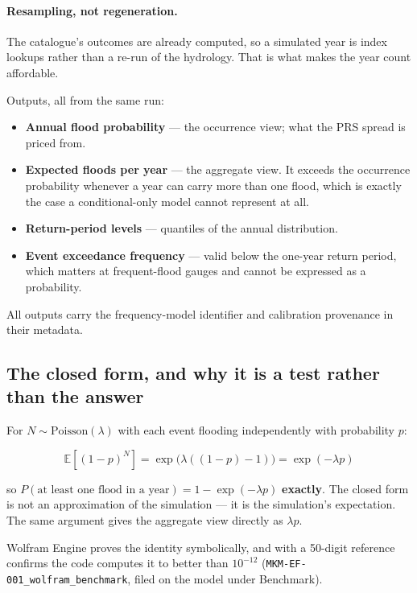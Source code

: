 \documentclass[11pt]{article}
\begin{document}
\paragraph{Resampling, not regeneration.}
The catalogue's outcomes are already computed, so a simulated year is index
lookups rather than a re-run of the hydrology. That is what makes the year count
affordable.

\medskip
\noindent Outputs, all from the same run:

\begin{itemize}[nosep]
  \item \textbf{Annual flood probability} --- the occurrence view; what the PRS
        spread is priced from.
  \item \textbf{Expected floods per year} --- the aggregate view. It exceeds the
        occurrence probability whenever a year can carry more than one flood,
        which is exactly the case a conditional-only model cannot represent at
        all.
  \item \textbf{Return-period levels} --- quantiles of the annual distribution.
  \item \textbf{Event exceedance frequency} --- valid below the one-year return
        period, which matters at frequent-flood gauges and cannot be expressed
        as a probability.
\end{itemize}

\noindent All outputs carry the frequency-model identifier and calibration
provenance in their metadata.

\subsection{The closed form, and why it is a test rather than the answer}
\label{sec:closedform}

For $N \sim \text{Poisson}(\lambda)$ with each event flooding independently with
probability $p$:

\begin{equation}
\mathbb{E}\!\left[(1-p)^N\right] = \exp\!\big(\lambda((1-p) - 1)\big) = \exp(-\lambda p)
\end{equation}

so $P(\text{at least one flood in a year}) = 1 - \exp(-\lambda p)$
\textbf{exactly}. The closed form is not an approximation of the simulation ---
it is the simulation's expectation. The same argument gives the aggregate view
directly as $\lambda p$.

Wolfram Engine proves the identity symbolically, and with a 50-digit reference
confirms the code computes it to better than $10^{-12}$
(\texttt{MKM-EF-001\_wolfram\_benchmark}, filed on the model under Benchmark).
\end{document}
